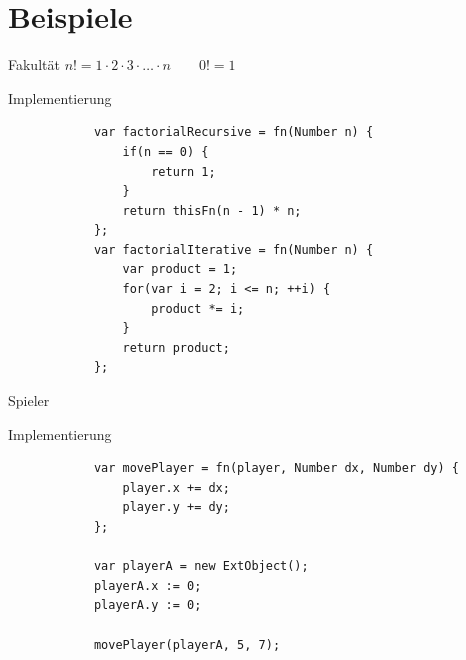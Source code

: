 \documentclass[ucs,9pt]{beamer}
\begin{document}
\section{Beispiele}

\begin{frame}[fragile]{Fakultät}
	$n! = 1 \cdot 2 \cdot 3 \cdot \ldots \cdot n\qquad0! = 1$
	\begin{block}{Implementierung}
		\begin{lstlisting}
			var factorialRecursive = fn(Number n) {
			    if(n == 0) {
			        return 1;
			    }
			    return thisFn(n - 1) * n;
			};
			var factorialIterative = fn(Number n) {
			    var product = 1;
			    for(var i = 2; i <= n; ++i) {
			        product *= i;
			    }
			    return product;
			};
		\end{lstlisting}
	\end{block}
\end{frame}

\begin{frame}[fragile]{Spieler}
	\begin{block}{Implementierung}
		\begin{lstlisting}
			var movePlayer = fn(player, Number dx, Number dy) {
			    player.x += dx;
			    player.y += dy;
			};

			var playerA = new ExtObject();
			playerA.x := 0;
			playerA.y := 0;

			movePlayer(playerA, 5, 7);
		\end{lstlisting}
	\end{block}
\end{frame}

\HNIlastframe
\end{document}
